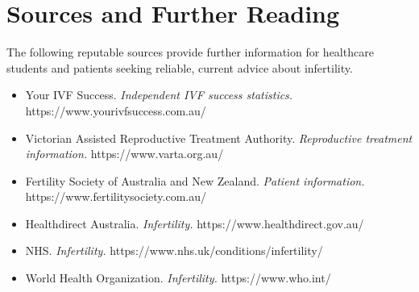 \section*{Sources and Further Reading}
The following reputable sources provide further information for healthcare students and patients seeking reliable, current advice about infertility.
\begin{itemize}
    \item Your IVF Success. \textit{Independent IVF success statistics.} https://www.yourivfsuccess.com.au/
    \item Victorian Assisted Reproductive Treatment Authority. \textit{Reproductive treatment information.} https://www.varta.org.au/
    \item Fertility Society of Australia and New Zealand. \textit{Patient information.} https://www.fertilitysociety.com.au/
    \item Healthdirect Australia. \textit{Infertility.} https://www.healthdirect.gov.au/
    \item NHS. \textit{Infertility.} https://www.nhs.uk/conditions/infertility/
    \item World Health Organization. \textit{Infertility.} https://www.who.int/
\end{itemize}
